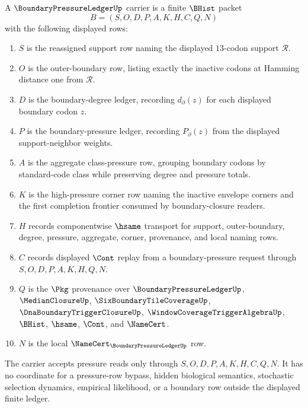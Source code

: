 \begin{definition}
\label{def:boundary-pressure-ledger-carrier}
A $\BoundaryPressureLedgerUp$ carrier is a finite $\BHist$ packet
$$
B=(S,O,D,P,A,K,H,C,Q,N)
$$
with the following displayed rows:
\begin{enumerate}
\item $S$ is the reassigned support row naming the displayed $13$-codon support $\mathcal{R}$.
\item $O$ is the outer-boundary row, listing exactly the inactive codons at Hamming distance one from $\mathcal{R}$.
\item $D$ is the boundary-degree ledger, recording $d_{\partial}(z)$ for each displayed boundary codon $z$.
\item $P$ is the boundary-pressure ledger, recording $P_{\partial}(z)$ from the displayed support-neighbor weights.
\item $A$ is the aggregate class-pressure row, grouping boundary codons by standard-code class while preserving degree and pressure totals.
\item $K$ is the high-pressure corner row naming the inactive envelope corners and the first completion frontier consumed by boundary-closure readers.
\item $H$ records componentwise $\hsame$ transport for support, outer-boundary, degree, pressure, aggregate, corner, provenance, and local naming rows.
\item $C$ records displayed $\Cont$ replay from a boundary-pressure request through $S,O,D,P,A,K,H,Q,N$.
\item $Q$ is the $\Pkg$ provenance over $\BoundaryPressureLedgerUp$, $\MedianClosureUp$, $\SixBoundaryTileCoverageUp$, $\DnaBoundaryTriggerClosureUp$, $\WindowCoverageTriggerAlgebraUp$, $\BHist$, $\hsame$, $\Cont$, and $\NameCert$.
\item $N$ is the local $\NameCert_{\BoundaryPressureLedgerUp}$ row.
\end{enumerate}
The carrier accepts pressure reads only through $S,O,D,P,A,K,H,C,Q,N$. It has no coordinate for a pressure-row bypass, hidden biological semantics, stochastic selection dynamics, empirical likelihood, or a boundary row outside the displayed finite ledger.
\end{definition}

